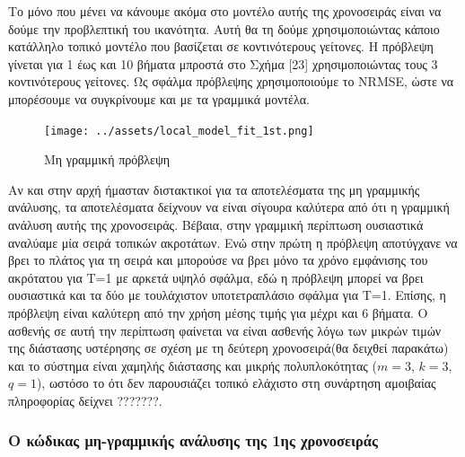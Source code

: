\documentclass[11pt,]{article}
\begin{document}
Το μόνο που μένει να κάνουμε ακόμα στο μοντέλο αυτής της χρονοσειράς
είναι να δούμε την προβλεπτική του ικανότητα. Αυτή θα τη δούμε
χρησιμοποιώντας κάποιο κατάλληλο τοπικό μοντέλο που βασίζεται σε
κοντινότερους γείτονες. Η πρόβλεψη γίνεται για 1 έως και 10 βήματα
μπροστά στο Σχήμα {[}23{]} χρησιμοποιώντας τους 3 κοντινότερους
γείτονες. Ως σφάλμα πρόβλεψης χρησιμοποιούμε το NRMSE, ώστε να
μπορέσουμε να συγκρίνουμε και με τα γραμμικά μοντέλα.

\begin{figure}
\centering
\texttt{[image: ../assets/local\_model\_fit\_1st.png]}
\caption{Μη γραμμική πρόβλεψη}
\end{figure}

Αν και στην αρχή ήμασταν διστακτικοί για τα αποτελέσματα της μη
γραμμικής ανάλυσης, τα αποτελέσματα δείχνουν να είναι σίγουρα καλύτερα
από ότι η γραμμική ανάλυση αυτής της χρονοσειράς. Βέβαια, στην γραμμική
περίπτωση ουσιαστικά αναλύαμε μία σειρά τοπικών ακροτάτων. Ενώ στην
πρώτη η πρόβλεψη αποτύγχανε να βρει το πλάτος για τη σειρά και μπορούσε
να βρει μόνο τα χρόνο εμφάνισης του ακρότατου για T=1 με αρκετά υψηλό
σφάλμα, εδώ η πρόβλεψη μπορεί να βρει ουσιαστικά και τα δύο με
τουλάχιστον υποτετραπλάσιο σφάλμα για T=1. Επίσης, η πρόβλεψη είναι
καλύτερη από την χρήση μέσης τιμής για μέχρι και 6 βήματα. Ο ασθενής σε
αυτή την περίπτωση φαίνεται να είναι ασθενής λόγω των μικρών τιμών της
διάστασης υστέρησης σε σχέση με τη δεύτερη χρονοσειρά(θα δειχθεί
παρακάτω) και το σύστημα είναι χαμηλής διάστασης και μικρής
πολυπλοκότητας (\(m=3\), \(k=3\), \(q=1\)), ωστόσο το ότι δεν
παρουσιάζει τοπικό ελάχιστο στη συνάρτηση αμοιβαίας πληροφορίας δείχνει
???????.

\hypertarget{ux3bf-ux3baux3ceux3b4ux3b9ux3baux3b1ux3c2-ux3bcux3b7-ux3b3ux3c1ux3b1ux3bcux3bcux3b9ux3baux3aeux3c2-ux3b1ux3bdux3acux3bbux3c5ux3c3ux3b7ux3c2-ux3c4ux3b7ux3c2-1ux3b7ux3c2-ux3c7ux3c1ux3bfux3bdux3bfux3c3ux3b5ux3b9ux3c1ux3acux3c2}{%
\subsubsection{Ο κώδικας μη-γραμμικής ανάλυσης της 1ης
χρονοσειράς}\label{ux3bf-ux3baux3ceux3b4ux3b9ux3baux3b1ux3c2-ux3bcux3b7-ux3b3ux3c1ux3b1ux3bcux3bcux3b9ux3baux3aeux3c2-ux3b1ux3bdux3acux3bbux3c5ux3c3ux3b7ux3c2-ux3c4ux3b7ux3c2-1ux3b7ux3c2-ux3c7ux3c1ux3bfux3bdux3bfux3c3ux3b5ux3b9ux3c1ux3acux3c2}}
\end{document}
